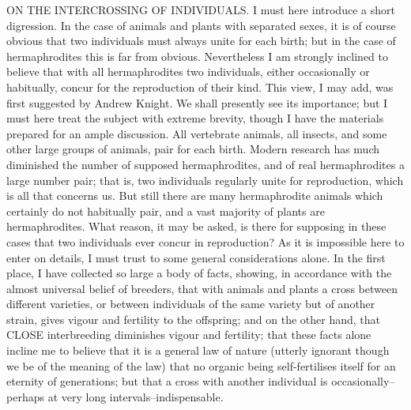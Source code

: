 ON THE INTERCROSSING OF INDIVIDUALS.
I must here introduce a short digression. In the case of animals and plants with separated sexes, it is of course obvious that two individuals must always unite for each birth; but in the case of hermaphrodites this is far from obvious. Nevertheless I am strongly inclined to believe that with all hermaphrodites two individuals, either occasionally or habitually, concur for the reproduction of their kind. This view, I may add, was first suggested by Andrew Knight. We shall presently see its importance; but I must here treat the subject with extreme brevity, though I have the materials prepared for an ample discussion. All vertebrate animals, all insects, and some other large groups of animals, pair for each birth. Modern research has much diminished the number of supposed hermaphrodites, and of real hermaphrodites a large number pair; that is, two individuals regularly unite for reproduction, which is all that concerns us. But still there are many hermaphrodite animals which certainly do not habitually pair, and a vast majority of plants are hermaphrodites. What reason, it may be asked, is there for supposing in these cases that two individuals ever concur in reproduction? As it is impossible here to enter on details, I must trust to some general considerations alone.
In the first place, I have collected so large a body of facts, showing, in accordance with the almost universal belief of breeders, that with animals and plants a cross between different varieties, or between individuals of the same variety but of another strain, gives vigour and fertility to the offspring; and on the other hand, that CLOSE interbreeding diminishes vigour and fertility; that these facts alone incline me to believe that it is a general law of nature (utterly ignorant though we be of the meaning of the law) that no organic being self-fertilises itself for an eternity of generations; but that a cross with another individual is occasionally--perhaps at very long intervals--indispensable.
